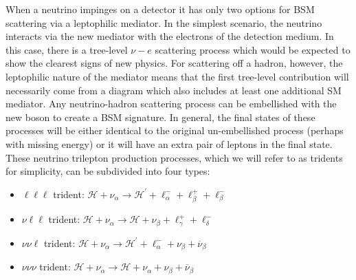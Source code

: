 When a neutrino impinges on a detector it has only two options for BSM scattering via a leptophilic mediator. In the simplest scenario, the neutrino interacts via the new mediator with the electrons of the detection medium. In this case, there is a tree-level $\nu-e$ scattering process which would be expected to show the clearest signs of new physics. For scattering off a hadron, however, the leptophilic nature of the mediator means that the first tree-level contribution will necessarily come from a diagram which also includes at least one additional SM mediator.
%
Any neutrino-hadron scattering process can be embellished with the new boson to create a BSM signature. In general, the final states of these processes will be either identical to the original un-embellished process (perhaps with missing energy) or it will have an extra pair of leptons in the final state. These neutrino trilepton production processes, which we will refer to as tridents for simplicity, can be subdivided into four types:
%
\begin{itemize}
%
\item $\ell \ell \ell$ trident: $\mathcal{H} + \nu_\alpha \to \mathcal{H}^\prime + \ell^-_\alpha + \ell^+_\beta + \ell^-_\beta$
%
\item $\nu \ell \ell$ trident: $\mathcal{H} + \nu_\alpha \to \mathcal{H} + \nu_\beta + \ell^+_\gamma + \ell^-_\delta$
%
\item $\nu \nu \ell$ trident: $\mathcal{H} + \nu_\alpha \to \mathcal{H}^\prime + \ell^-_\alpha + \nu_\beta + \overline{\nu}_\beta$
%
\item $\nu \nu \nu$ trident: $\mathcal{H} + \nu_\alpha \to \mathcal{H} + \nu_\alpha + \nu_\beta + \overline{\nu}_\beta$
%
\end{itemize}
%

